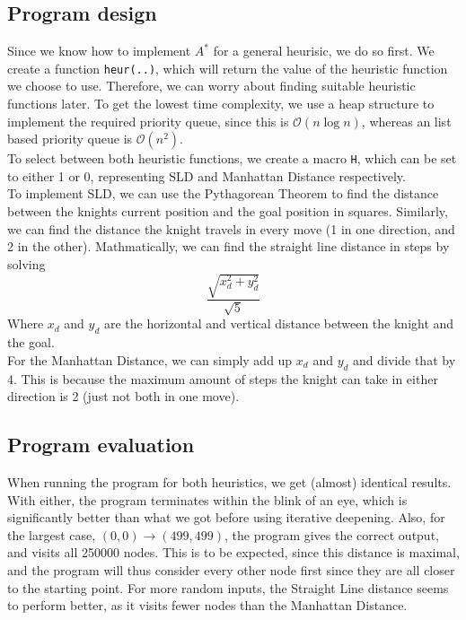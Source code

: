 \documentclass{article}
\begin{document}
\subsection*{Program design}
Since we know how to implement $A^*$ for a general heurisic, we do so first. We create a function \verb|heur(..)|, which will return the value of the heuristic function we choose to use. Therefore, we can worry about finding suitable heuristic functions later. To get the lowest time complexity, we use a heap structure to implement the required priority queue, since this is $\mathcal{O}(n\log{}n)$, whereas an list based priority queue is $\mathcal{O}(n^2)$.\\
To select between both heuristic functions, we create a macro \verb|H|, which can be set to either 1 or 0, representing SLD and Manhattan Distance respectively. \\
To implement SLD, we can use the Pythagorean Theorem to find the distance between the knights current position and the goal position in squares. Similarly, we can find the distance the knight travels in every move (1 in one direction, and 2 in the other). Mathmatically, we can find the straight line distance in steps by solving
$$ \frac{\sqrt{x_d^2+y_d^2}}{\sqrt{5}} $$
Where $x_d$ and $y_d$ are the horizontal and vertical distance between the knight and the goal.\\
For the Manhattan Distance, we can simply add up $x_d$ and $y_d$ and divide that by 4. This is because the maximum amount of steps the knight can take in either direction is 2 (just not both in one move). 

\subsection*{Program evaluation}
When running the program for both heuristics, we get (almost) identical results. With either, the program terminates within the blink of an eye, which is significantly better than what we got before using iterative deepening. Also, for the largest case, $(0,0)\rightarrow (499,499)$, the program gives the correct output, and visits all 250000 nodes. This is to be expected, since this distance is maximal, and the program will thus consider every other node first since they are all closer to the starting point. For more random inputs, the Straight Line distance seems to perform better, as it visits fewer nodes than the Manhattan Distance.
\end{document}

